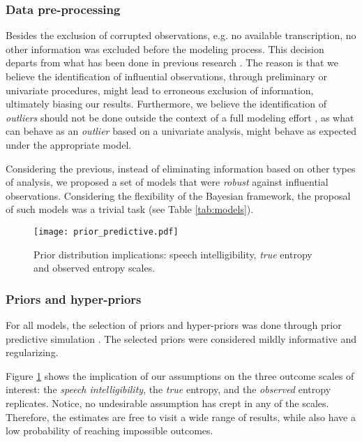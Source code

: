 \subsubsection{Data pre-processing} \label{ssSA:preprocessing}
%
Besides the exclusion of corrupted observations, e.g. no available transcription, no other information was excluded before the modeling process. This decision departs from what has been done in previous research \cite{Boonen_et_al_2020, vanDaal_2020, Boonen_et_al_2021}. The reason is that we believe the identification of influential observations, through preliminary or univariate procedures, might lead to erroneous exclusion of information, ultimately biasing our results. Furthermore, we believe the identification of \textit{outliers} should not be done outside the context of a full modeling effort \citep{McElreath_2020}, as what can behave as an \textit{outlier} based on a univariate analysis, might behave as expected under the appropriate model.

Considering the previous, instead of eliminating information based on other types of analysis, we proposed a set of models that were \textit{robust} against influential observations. Considering the flexibility of the Bayesian framework, the proposal of such models was a trivial task (see Table \ref{tab:models}).
%
%
%
\begin{figure}[!h]
	\centering
	\texttt{[image: prior\_predictive.pdf]}
	\caption[Prior distribution implications]{Prior distribution implications: speech intelligibility, \textit{true} entropy and observed entropy scales.}
	\label{fig:priors}
\end{figure}
%
%
\subsubsection{Priors and hyper-priors}
%
For all models, the selection of priors and hyper-priors was done through prior predictive simulation \citep{McElreath_2020}. The selected priors were considered mildly informative and regularizing. 

Figure \ref{fig:priors} shows the implication of our assumptions on the three outcome scales of interest: the \textit{speech intelligibility}, the \textit{true} entropy, and the \textit{observed} entropy replicates. Notice, no undesirable assumption has crept in any of the scales. Therefore, the estimates are free to visit a wide range of results, while also have a low probability of reaching impossible outcomes.

